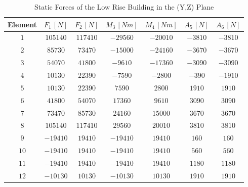 \documentclass[11pt,a4paper,titlepage]{report}
\begin{document}
\begin{table}[h]
    \centering
    \begin{tabular}{c|c|c|c|c|c|c}
     Element & $F_1 \,[N]$ & $F_2 \,[N]$ & $M_3\, [Nm]$ & $M_4 \,[Nm]$ & $A_5 \,[N]$ & $A_6\, [N]$ \\
         \hline
    $1$ & $105140$ & $117410$ & $-29560$ & $-20010$ & $-3810$ & $-3810$ \\
    $2$ & $85730$ & $73470$ & $-15000$ & $-24160$ & $-3670$ & $-3670$ \\
    $3$ & $54070$ & $41800$ & $-9610$ & $-17360$ & $-3090$ & $-3090$ \\
    $4$ & $10130$ & $22390$ & $-7590$ & $-2800$ & $-390$ & $-1910$ \\
    $5$ & $10130$ & $22390$ & $7590$ & $2800$ & $1910$ & $1910$ \\
    $6$ & $41800$ & $54070$ & $17360$ & $9610$ & $3090$ & $3090$ \\
    $7$ & $73470$ & $85730$ & $24160$ & $15000$ & $3670$ & $3670$ \\
    $8$ & $105140$ & $117410$ & $29560$ & $20010$ & $3810$ & $3810$ \\
    $9$ & $-19410$ & $19410$ & $-19410$ & $19410$ & $160$ & $160$ \\
    $10$ & $-19410$ & $19410$ & $-19410$ & $19410$ & $560$ & $560$ \\
    $11$ & $-19410$ & $19410$ & $-19410$ & $19410$ & $1180$ & $1180$ \\
    $12$ & $-10130$ & $10130$ & $-10130$ & $10130$ & $1910$ & $1910$ \\
    \end{tabular}
    \caption{Static Forces of the Low Rise Building in the (Y,Z) Plane}
    \label{tab:static forces y}
\end{table}
\end{document}
